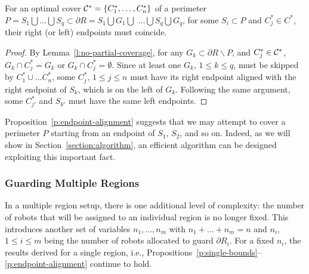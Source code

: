 \begin{proposition}\label{p:endpoint-alignment}
For an optimal cover $\mathcal C^* = \{C_1^*,\ldots, C_n^*\}$ of a perimeter 
$P = S_1 \bigcup \ldots \bigcup S_q \subset \partial R = S_1 \bigcup G_1 
\bigcup $ $\ldots \bigcup S_q \bigcup G_q$, for some $S_i \subset P$ and 
$C_j^* \in C^*$, their right (or left) endpoints must coincide. 
\end{proposition}
\begin{proof}
By Lemma~\ref{l:no-partial-coverage}, for any $G_k \subset \partial R 
\backslash P$, and $C_j^* \in \mathcal C^*$, $G_k \cap C_j^* = G_k$ or 
$G_k \cap C_j^* = \emptyset$. Since at least one $G_k$, $1 \le k \le q$, 
must be skipped by $C_1^* \cup \ldots C_n^*$, some $C_j^*$, $1 \le j \le n$ 
must have its right endpoint aligned with the right endpoint of $S_k$, 
which is on the left of $G_k$. Following the same argument, some 
$C_{j'}^*$ and $S_{k'}$ must have the same left endpoints. 
\end{proof}

Proposition~\ref{p:endpoint-alignment} suggests that we may attempt to cover 
a perimeter $P$ starting from an endpoint of $S_1$, $S_2$, and so on. 
Indeed, as we will show in Section~\ref{section:algorithm}, an efficient 
algorithm can be designed exploiting this important fact. 


\subsubsection{Guarding Multiple Regions}
In a multiple region setup, there is one additional level of complexity:
the number of robots that will be assigned to an individual region is 
no longer fixed. This introduces another set of variables $n_1, \ldots, 
n_m$ with $n_1 + \ldots + n_m = n$ and $n_i$, $1 \le i \le m$ being the 
number of robots allocated to guard $\partial R_i$. For a fixed $n_i$, 
the results derived for a single region, i.e., 
Propositions~\ref{p:single-bounds}--\ref{p:endpoint-alignment} continue 
to hold.

